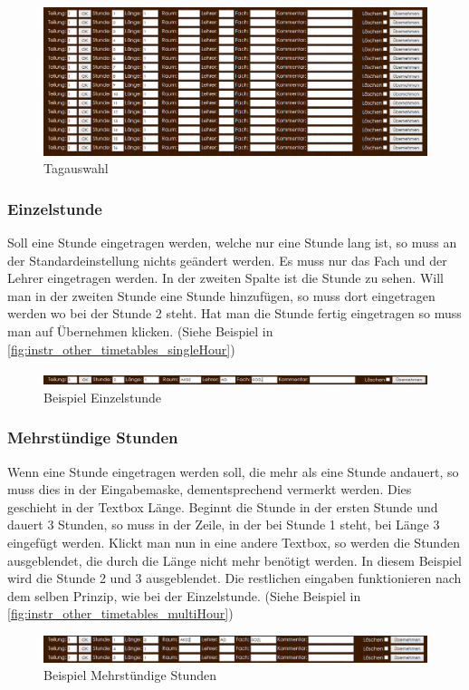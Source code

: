 \begin{figure}[H]
\centering
\includegraphics[keepaspectratio=true, width=17cm]{images/screenshots/timetables_input_layout.png}
\caption{Tagauswahl}
\label{fig:instr_other_timetables_layout}
\end{figure}
\subsubsection{Einzelstunde}
Soll eine Stunde eingetragen werden, welche nur eine Stunde lang ist, so muss an der Standardeinstellung nichts geändert werden. Es muss nur das Fach und der Lehrer eingetragen werden. In der zweiten Spalte ist die Stunde zu sehen. Will man in der zweiten Stunde eine Stunde hinzufügen, so muss dort eingetragen werden wo bei der Stunde 2 steht. Hat man die Stunde fertig eingetragen so muss man auf Übernehmen klicken. (Siehe Beispiel in \autoref{fig:instr_other_timetables_singleHour})
\begin{figure}[H]
\centering
\includegraphics[keepaspectratio=true, width=17cm]{images/screenshots/timetables_input_singleHour.png}
\caption{Beispiel Einzelstunde}
\label{fig:instr_other_timetables_singleHour}
\end{figure}
\subsubsection{Mehrstündige Stunden}
Wenn eine Stunde eingetragen werden soll, die mehr als eine Stunde andauert, so muss dies in der Eingabemaske, dementsprechend vermerkt werden. Dies geschieht in der Textbox Länge. Beginnt die Stunde in der ersten Stunde und dauert 3 Stunden, so muss in der Zeile, in der bei Stunde 1 steht, bei Länge 3 eingefügt werden. Klickt man nun in eine andere Textbox, so werden die Stunden ausgeblendet, die durch die Länge nicht mehr benötigt werden. In diesem Beispiel wird die Stunde 2 und 3 ausgeblendet. Die restlichen eingaben funktionieren nach dem selben Prinzip, wie bei der Einzelstunde. (Siehe Beispiel in \autoref{fig:instr_other_timetables_multiHour})
\begin{figure}[H]
\centering
\includegraphics[keepaspectratio=true, width=17cm]{images/screenshots/timetables_input_multiHour.png}
\caption{Beispiel Mehrstündige Stunden}
\label{fig:instr_other_timetables_multiHour}
\end{figure}
